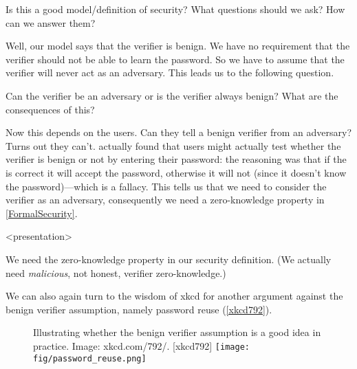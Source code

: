 \begin{frame}
  \begin{exercise}
    Is this a good model/definition of security?
    What questions should we ask?
    How can we answer them?
  \end{exercise}
\end{frame}

Well, our model says that the verifier is benign.
We have no requirement that the verifier should not be able to learn the 
password.
So we have to assume that the verifier will never act as an adversary.
This leads us to the following question.

\begin{frame}
  \begin{question}
    Can the verifier be an adversary or is the verifier always benign?
    What are the consequences of this?
  \end{question}
\end{frame}

Now this depends on the users.
Can they tell a benign verifier from an adversary?
Turns out they can't\autocite{WhyPhishingWorks}.
 actually found that users might actually test 
whether the verifier is benign or not by entering their password:
the reasoning was that if the is correct it will accept the password, otherwise 
it will not (since it doesn't know the password)---which is a fallacy.
This tells us that we need to consider the verifier as an adversary, 
consequently we need a zero-knowledge property in \cref{FormalSecurity}.

\begin{frame}<presentation>
  \begin{example}
  \end{example}

  \pause

  \begin{example}[Consequences]
    We need the zero-knowledge property in our security definition.
    (We actually need \emph{malicious}, not honest, verifier zero-knowledge.)
  \end{example}
\end{frame}

We can also again turn to the wisdom of xkcd for another argument against the 
benign verifier assumption, namely password reuse (\cref{xkcd792}).

\begin{frame}
  \begin{figure}
    \begin{sidecaption}[xkcd 792]{%
      Illustrating whether the benign verifier assumption is a good idea in 
      practice.
      Image: xkcd.com/792/.
    }[xkcd792]
      \flushscap
      \texttt{[image: fig/password\_reuse.png]}
    \end{sidecaption}
  \end{figure}
\end{frame}

